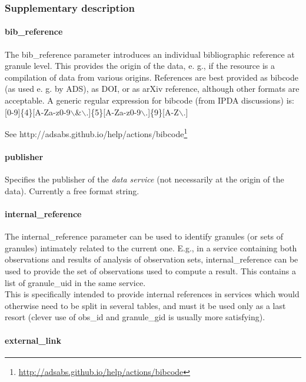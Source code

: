 \documentclass[11pt,a4paper]{ivoa}
\begin{document}
\subsubsection{Supplementary description}

\paragraph{bib\_reference}

The bib\_reference parameter introduces an individual bibliographic reference at granule level. This provides the origin of the data, e. g., if the resource is a compilation of data from various origins. References are best provided as bibcode (as used e. g. by ADS), as DOI, or as arXiv reference, although other formats are acceptable. A generic regular expression for bibcode (from IPDA discussions) is: [0-9]\{4\}[A-Za-z0-9$\backslash$\&$\backslash$.]\{5\}[A-Za-z0-9$\backslash$.]\{9\}[A-Z$\backslash$.] 

See http://adsabs.github.io/help/actions/bibcode\footnote{\url{http://adsabs.github.io/help/actions/bibcode}}

\paragraph{publisher}

Specifies the publisher of the \emph{data service} (not necessarily at the origin of the data). Currently a free format string.\\

\paragraph{internal\_reference}

The internal\_reference parameter can be used to identify granules (or sets of granules) intimately related to the current one. E.g., in a service containing both observations and results of analysis of observation sets, internal\_reference can be used to provide the set of observations used to compute a result. This contains a list of granule\_uid in the same service.\\This is specifically intended to provide internal references in services which would otherwise need to be split in several tables, and must it be used only as a last resort (clever use of  obs\_id and granule\_gid is usually more satisfying). 

\paragraph{external\_link}
\end{document}
